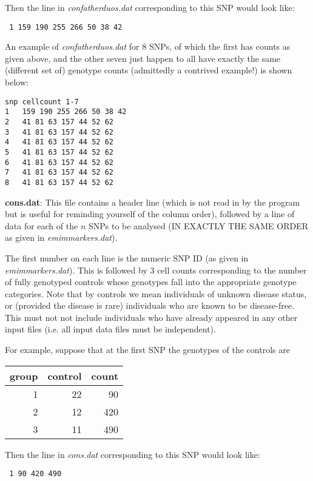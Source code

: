 \documentclass[a4paper,11pt]{report}
\begin{document}
Then the line in	{\it  confatherduos.dat} corresponding to this SNP 
would look like:

{\tt
1 	159 190 255 266 50 38 42
}

An example of {\it  confatherduos.dat} for 8 SNPs, of which the first has counts as given above, and the other seven just happen to all have exactly the same (different set of) genotype counts (admittedly a contrived example!) is shown below:

\begin{verbatim}
snp	cellcount 1-7
1 	159 190 255 266 50 38 42
2 	41 81 63 157 44 52 62
3 	41 81 63 157 44 52 62
4 	41 81 63 157 44 52 62
5 	41 81 63 157 44 52 62
6 	41 81 63 157 44 52 62
7 	41 81 63 157 44 52 62
8 	41 81 63 157 44 52 62
\end{verbatim}
 
\bigskip



	{\bf  cons.dat}:  This file contains a header line
(which is not read in by the program but is useful for reminding
yourself of the  column order), followed by a line of data
for each of the $n$ SNPs to be analysed (IN EXACTLY THE SAME ORDER
as given in {\it emimmarkers.dat}).

The first number on each line is the numeric SNP ID (as given in {\it emimmarkers.dat}). This is followed by 3 cell counts corresponding to the number
of fully genotyped controls whose genotypes 
fall into the appropriate genotype categories. 
Note that by controls we mean individuals of unknown disease status, or
(provided the disease is rare) individuals who are known to
be disease-free.  This must not not include individuals
who have already appeared in any other input files 
(i.e. all input data files must be
independent).


\newpage

For example, suppose that at the first SNP the genotypes of the controls are

\begin{tabular}{rrr} 
group    &   control &count \\ \hline
1     &  22   &   90\\
2     &  12   &   420\\
3     &  11   &   490\\
\end{tabular}

Then the line in	{\it  cons.dat} corresponding to this SNP 
would look like:

{\tt
1 	90 420 490
}
\end{document}
